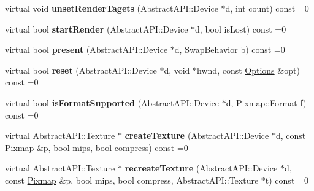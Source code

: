 \begin{DoxyCompactItemize}
\item 
\hypertarget{class_tempest_1_1_abstract_a_p_i_a099c9cb9e0de13c7bfa052d4cf24ac08}{virtual void {\bfseries unset\+Render\+Tagets} (Abstract\+A\+P\+I\+::\+Device $\ast$d, int count) const =0}\label{class_tempest_1_1_abstract_a_p_i_a099c9cb9e0de13c7bfa052d4cf24ac08}

\item 
\hypertarget{class_tempest_1_1_abstract_a_p_i_a664cfe6c07d3abaf67e2c46102f5092e}{virtual bool {\bfseries start\+Render} (Abstract\+A\+P\+I\+::\+Device $\ast$d, bool is\+Lost) const =0}\label{class_tempest_1_1_abstract_a_p_i_a664cfe6c07d3abaf67e2c46102f5092e}

\item 
\hypertarget{class_tempest_1_1_abstract_a_p_i_a675fa685e3f5dac3596fe429417d6ed4}{virtual bool {\bfseries present} (Abstract\+A\+P\+I\+::\+Device $\ast$d, Swap\+Behavior b) const =0}\label{class_tempest_1_1_abstract_a_p_i_a675fa685e3f5dac3596fe429417d6ed4}

\item 
\hypertarget{class_tempest_1_1_abstract_a_p_i_a55827fb1eeea2c1e727b8119bc0d82d9}{virtual bool {\bfseries reset} (Abstract\+A\+P\+I\+::\+Device $\ast$d, void $\ast$hwnd, const \hyperlink{struct_tempest_1_1_abstract_a_p_i_1_1_options}{Options} \&opt) const =0}\label{class_tempest_1_1_abstract_a_p_i_a55827fb1eeea2c1e727b8119bc0d82d9}

\item 
\hypertarget{class_tempest_1_1_abstract_a_p_i_ac4d98dc7f94caa3163971cc452df01f0}{virtual bool {\bfseries is\+Format\+Supported} (Abstract\+A\+P\+I\+::\+Device $\ast$d, Pixmap\+::\+Format f) const =0}\label{class_tempest_1_1_abstract_a_p_i_ac4d98dc7f94caa3163971cc452df01f0}

\item 
\hypertarget{class_tempest_1_1_abstract_a_p_i_ab03f7dda94ea39f2464766061988a339}{virtual Abstract\+A\+P\+I\+::\+Texture $\ast$ {\bfseries create\+Texture} (Abstract\+A\+P\+I\+::\+Device $\ast$d, const \hyperlink{class_tempest_1_1_pixmap}{Pixmap} \&p, bool mips, bool compress) const =0}\label{class_tempest_1_1_abstract_a_p_i_ab03f7dda94ea39f2464766061988a339}

\item 
\hypertarget{class_tempest_1_1_abstract_a_p_i_aaeaf86ad91427fd43f0a29f9863b11c8}{virtual Abstract\+A\+P\+I\+::\+Texture $\ast$ {\bfseries recreate\+Texture} (Abstract\+A\+P\+I\+::\+Device $\ast$d, const \hyperlink{class_tempest_1_1_pixmap}{Pixmap} \&p, bool mips, bool compress, Abstract\+A\+P\+I\+::\+Texture $\ast$t) const =0}\label{class_tempest_1_1_abstract_a_p_i_aaeaf86ad91427fd43f0a29f9863b11c8}


\end{DoxyCompactItemize}
